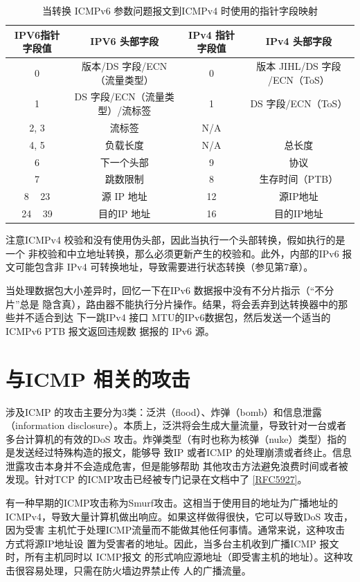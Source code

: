 \begin{table}[]
    \centering
    \caption{当转换 ICMPv6 参数问题报文到ICMPv4 时使用的指针字段映射}
    \begin{tabular}{c|c|c|c}
        \hline
		IPV6指针字段值	&	IPV6 头部字段	&	IPv4 指针字段值	&	IPv4 头部字段    \\ \hline
		0 & 版本/DS 字段/ECN（流量类型） & 0 & 版本 JIHL/DS 字段 /ECN（ToS） \\ \hline
		1 & DS 字段/ECN（流量类型）/流标签 & 1 & DS 字段/ECN（ToS） \\ \hline
		2, 3 & 流标签 & N/A &  \\ \hline
		4, 5 & 负载长度 & N/A & 总长度 \\ \hline
		6 & 下一个头部 & 9 & 协议 \\ \hline
		7 & 跳数限制 & 8 & 生存时间（PTB） \\ \hline
		8 ~ 23 & 源 IP 地址 & 12 & 源IP地址 \\ \hline
		24 ~ 39 & 目的IP 地址 & 16 & 目的IP地址 \\ \hline
    \end{tabular}
\end{table}

注意ICMPv4 校验和没有使用伪头部，因此当执行一个头部转换，假如执行的是一个
非校验和中立地址转换，那么必须更新产生的校验和。此外，内部的IPv6 报文可能包含非
IPv4 可转换地址，导致需要进行状态转换（参见第7章）。

当处理数据包大小差异时，回忆一下在IPv6 数据报中没有不分片指示（“不分片”总是
隐含真），路由器不能执行分片操作。结果，将会丢弃到达转换器中的那些并不适合到达
下一跳IPv4 接口 MTU的IPv6数据包，然后发送一个适当的ICMPv6 PTB 报文返回违规数
据报的 IPv6 源。

\section{与ICMP 相关的攻击}

涉及ICMP 的攻击主要分为3类：泛洪（flood）、炸弹（bomb）和信息泄露 （information
disclosure）。本质上，泛洪将会生成大量流量，导致针对一台或者多台计算机的有效的DoS
攻击。炸弹类型（有时也称为核弹（nuke）类型）指的是发送经过特殊构造的报文，能够导
致IP 或者ICMP 的处理崩溃或者终止。信息泄露攻击本身并不会造成危害，但是能够帮助
其他攻击方法避免浪费时间或者被发现。针对TCP 的ICMP攻击已经被专门记录在文档中了
\href{https://www.rfc-editor.org/rfc/rfc5927}{[RFC5927]}。

有一种早期的ICMP攻击称为Smurf攻击。这相当于使用目的地址为广播地址的
ICMPv4，导致大量计算机做出响应。如果这样做得很快，它可以导致DoS 攻击，因为受害
主机忙于处理ICMP流量而不能做其他任何事情。通常来说，这种攻击方式将源IP地址设
置为受害者的地址。因此，当多台主机收到广播ICMP 报文时，所有主机同时以 ICMP报文
的形式响应源地址（即受害主机的地址）。这种攻击很容易处理，只需在防火墙边界禁止传
人的广播流量。

